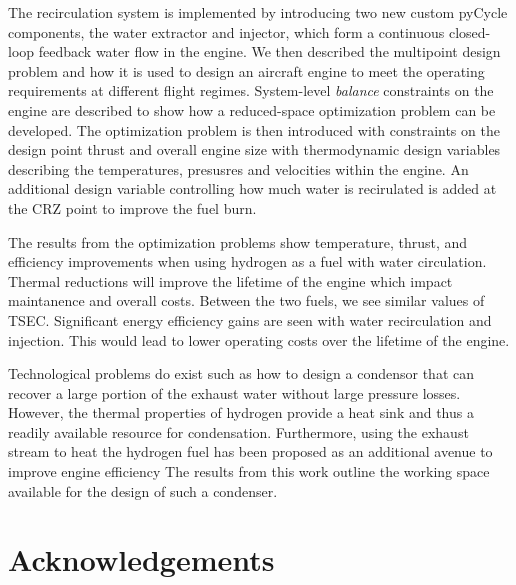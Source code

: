 \documentclass[conf]{new-aiaa}
\begin{document}
The recirculation system is implemented by introducing two new custom pyCycle components, the water extractor and injector, which form a continuous closed-loop feedback water flow in the engine.
We then described the multipoint design problem and how it is used to design an aircraft engine to meet the operating requirements at different flight regimes.
System-level \emph{balance} constraints on the engine are described to show how a reduced-space optimization problem can be developed.
The optimization problem is then introduced with constraints on the design point thrust and overall engine size with thermodynamic design variables describing the temperatures, presusres and velocities within the engine.
An additional design variable controlling how much water is recirulated is added at the CRZ point to improve the fuel burn.

The results from the optimization problems show temperature, thrust, and efficiency improvements when using hydrogen as a fuel with water circulation.
Thermal reductions will improve the lifetime of the engine which impact maintanence and overall costs.
Between the two fuels, we see similar values of TSEC.
Significant energy efficiency gains are seen with water recirculation and injection.
This would lead to lower operating costs over the lifetime of the engine.

Technological problems do exist such as how to design a condensor that can recover a large portion of the exhaust water without large pressure losses.
However, the thermal properties of hydrogen provide a heat sink and thus a readily available resource for condensation.
Furthermore, using the exhaust stream to heat the hydrogen fuel has been proposed as an additional avenue to improve engine efficiency%
The results from this work outline the working space available for the design of such a condenser.

\section{Acknowledgements}


\end{document}
